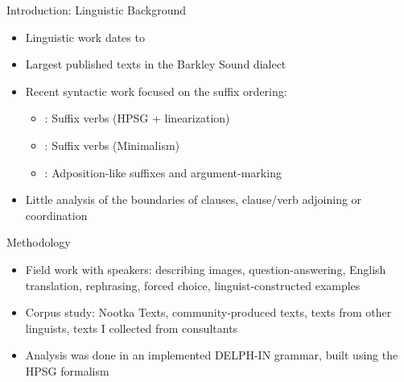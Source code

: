 \begin{frame}{Introduction: Linguistic Background}
\begin{itemize}
\item Linguistic work dates to \cite{sapir1911}
\item Largest published texts in the Barkley Sound dialect \citep{sapir1939, sapir1955}
\item Recent syntactic work focused on the suffix ordering:
\begin{itemize}
\item \cite{waldie2004}: Suffix verbs (HPSG + linearization)
\item \cite{wojdak2005}: Suffix verbs (Minimalism)
\item \cite{woo2007b}: Adposition-like suffixes and argument-marking
\end{itemize}
\item Little analysis of the boundaries of clauses, clause/verb adjoining or coordination
\end{itemize}
\end{frame}

\begin{frame}{Methodology}
\begin{itemize}
\item Field work with speakers: describing images, question-answering, English translation, rephrasing, forced choice, linguist-constructed examples
\item Corpus study: Nootka Texts, community-produced texts, texts from other linguists, texts I collected from consultants
\item Analysis was done in an implemented DELPH-IN grammar, built using the HPSG formalism
\end{itemize}
\end{frame}